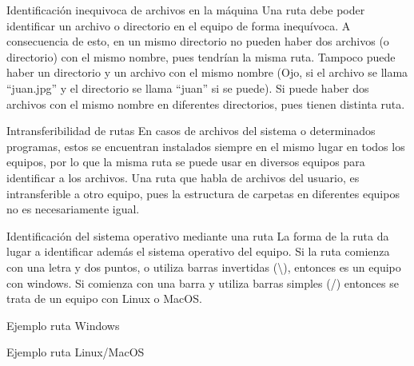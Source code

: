 
\begin{frame}{Identificación inequivoca de archivos en la máquina}
  Una ruta debe poder identificar un archivo o directorio en el equipo de forma inequívoca.
  \jump
  A consecuencia de esto, en un mismo directorio no pueden haber dos archivos (o directorio)
  con el mismo nombre, pues tendrían la misma ruta.
  \jump
  Tampoco puede haber un directorio y un archivo con el mismo nombre (Ojo, si el
  archivo se llama ``juan.jpg'' y el directorio se llama ``juan'' si se puede).
  \jump
  Si puede haber dos archivos con el mismo nombre en diferentes directorios,
  pues tienen distinta ruta.
\end{frame}


\begin{frame}{Intransferibilidad de rutas}
  En casos de archivos del sistema o determinados programas, estos
  se encuentran instalados siempre en el mismo lugar en todos los equipos, por
  lo que la misma ruta se puede usar en diversos equipos para identificar a los
  archivos.
  \jump
  Una ruta que habla de archivos del usuario, es intransferible a otro equipo,
  pues la estructura de carpetas en diferentes equipos no es necesariamente igual.
\end{frame}


\begin{frame}{Identificación del sistema operativo mediante una ruta}
  La forma de la ruta da lugar a identificar además el sistema operativo del
  equipo. Si la ruta comienza con una letra y dos puntos, o utiliza barras
  invertidas (\textbackslash), entonces es un equipo con windows. Si comienza
  con una barra y utiliza barras simples (\slash) entonces se trata de un
  equipo con Linux o MacOS.
  \jump
  \centerline{Ejemplo ruta Windows}
  \centerline{}
  \jump
  \centerline{Ejemplo ruta Linux/MacOS}
  \centerline{}
\end{frame}



